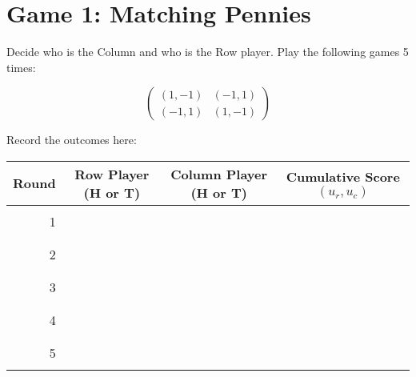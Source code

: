 \documentclass{article}
\begin{document}
\section{Game 1: Matching Pennies}

Decide who is the Column and who is the Row player. Play the following games 5 times:

$$\begin{pmatrix}
(1,-1) & (-1, 1)\\
(-1,1) & (1,-1)
\end{pmatrix}$$

Record the outcomes here:

\begin{center}
\begin{tabular}{r|c|c|c}
\toprule
Round    & Row Player (H or T) & Column Player (H or T) & Cumulative Score $(u_r,u_c)$\\
\midrule
         &                     &                        & \\
1        &                     &                        & \\
         &                     &                        & \\
         &                     &                        & \\
2        &                     &                        & \\
         &                     &                        & \\
         &                     &                        & \\
3        &                     &                        & \\
         &                     &                        & \\
         &                     &                        & \\
4        &                     &                        & \\
         &                     &                        & \\
         &                     &                        & \\
5        &                     &                        & \\
         &                     &                        & \\
\bottomrule
\end{tabular}
\end{center}
\end{document}
